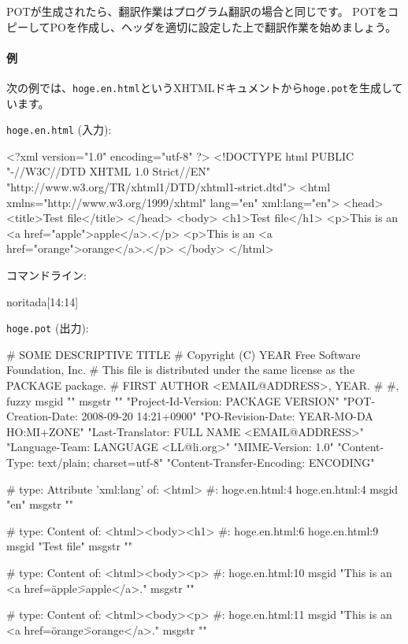 \documentclass[mingoth,a4paper]{jsarticle}
\begin{document}
POTが生成されたら、翻訳作業はプログラム翻訳の場合と同じです。
POTをコピーしてPOを作成し、ヘッダを適切に設定した上で翻訳作業を始めましょう。

\paragraph{例}
次の例では、\texttt{hoge.en.html}というXHTMLドキュメントから\texttt{hoge.pot}を生成しています。

\texttt{hoge.en.html} (入力):

\begin{commandline}
<?xml version="1.0" encoding="utf-8" ?>
<!DOCTYPE html PUBLIC "-//W3C//DTD XHTML 1.0 Strict//EN"
"http://www.w3.org/TR/xhtml1/DTD/xhtml1-strict.dtd">
<html xmlns="http://www.w3.org/1999/xhtml" lang="en" xml:lang="en">
<head>
<title>Test file</title>
</head>
<body>
<h1>Test file</h1>
<p>This is an <a href="apple">apple</a>.</p>
<p>This is an <a href="orange">orange</a>.</p>
</body>
</html>
\end{commandline}

コマンドライン:

\begin{commandline}
noritada[14:14]%
\end{commandline}

\texttt{hoge.pot} (出力):

\begin{commandline}
# SOME DESCRIPTIVE TITLE
# Copyright (C) YEAR Free Software Foundation, Inc.
# This file is distributed under the same license as the PACKAGE package.
# FIRST AUTHOR <EMAIL@ADDRESS>, YEAR.
#
#, fuzzy
msgid ""
msgstr ""
"Project-Id-Version: PACKAGE VERSION\n"
"POT-Creation-Date: 2008-09-20 14:21+0900\n"
"PO-Revision-Date: YEAR-MO-DA HO:MI+ZONE\n"
"Last-Translator: FULL NAME <EMAIL@ADDRESS>\n"
"Language-Team: LANGUAGE <LL@li.org>\n"
"MIME-Version: 1.0\n"
"Content-Type: text/plain; charset=utf-8\n"
"Content-Transfer-Encoding: ENCODING"

# type: Attribute 'xml:lang' of: <html>
#: hoge.en.html:4 hoge.en.html:4
msgid "en"
msgstr ""

# type: Content of: <html><body><h1>
#: hoge.en.html:6 hoge.en.html:9
msgid "Test file"
msgstr ""

# type: Content of: <html><body><p>
#: hoge.en.html:10
msgid "This is an <a href=\"apple\">apple</a>."
msgstr ""

# type: Content of: <html><body><p>
#: hoge.en.html:11
msgid "This is an <a href=\"orange\">orange</a>."
msgstr ""
\end{commandline}
\end{document}
